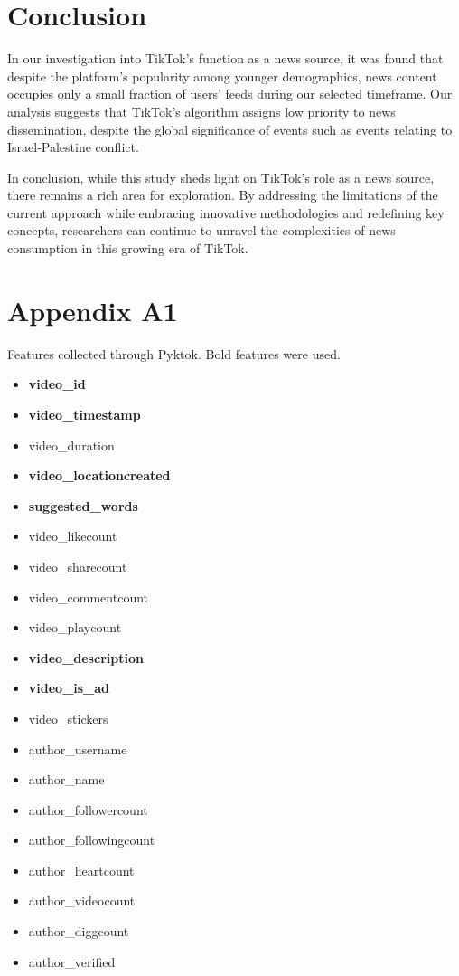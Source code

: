 \documentclass{article}
\begin{document}
\section{Conclusion}
In our investigation into TikTok's function as a news source, it was found that despite the platform's popularity among younger demographics, news content occupies only a small fraction of users' feeds during our selected timeframe. Our analysis suggests that TikTok's algorithm assigns low priority to news dissemination, despite the global significance of events such as events relating to Israel-Palestine conflict.\newline

{\noindent}In conclusion, while this study sheds light on TikTok's role as a news source, there remains a rich area for exploration. By addressing the limitations of the current approach while embracing innovative methodologies and redefining key concepts, researchers can continue to unravel the complexities of news consumption in this growing era of TikTok.
\newpage

\section*{Appendix A1}
Features collected through Pyktok. Bold features were used.
\singlespacing
\begin{itemize}
    \item {\bf video\_id}
    \item {\bf video\_timestamp}
    \item video\_duration
    \item {\bf video\_locationcreated}
    \item {\bf suggested\_words}
    \item video\_likecount
    \item video\_sharecount
    \item video\_commentcount
    \item video\_playcount
    \item {\bf video\_description}
    \item {\bf video\_is\_ad}
    \item video\_stickers
    \item author\_username
    \item author\_name
    \item author\_followercount
    \item author\_followingcount
    \item author\_heartcount
    \item author\_videocount
    \item author\_diggcount
    \item author\_verified
\end{itemize}
\newpage
\end{document}
